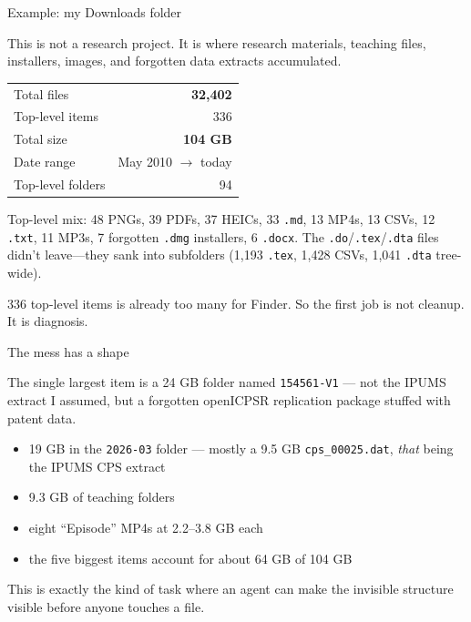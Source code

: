 \documentclass[aspectratio=169,11pt]{beamer}
\begin{document}
  \begin{frame}{Example: my Downloads folder}

  This is not a research project. It is where research materials, teaching files, installers, images, and forgotten data extracts accumulated.

  \vspace{0.18cm}

  \begin{center}
  \small
  \begin{tabular}{@{}lr@{}}
  \toprule
  Total files & \textbf{32,402} \\
  Top-level items & 336 \\
  Total size & \textbf{104 GB} \\
  Date range & May 2010 $\rightarrow$ today \\
  Top-level folders & 94 \\
  \bottomrule
  \end{tabular}
  \end{center}

  \vspace{0.1cm}

  {\small Top-level mix: 48 PNGs, 39 PDFs, 37 HEICs, 33 \texttt{.md}, 13 MP4s, 13 CSVs, 12 \texttt{.txt}, 11 MP3s, 7 forgotten \texttt{.dmg} installers, 6 \texttt{.docx}. The
  \texttt{.do}/\texttt{.tex}/\texttt{.dta} files didn't leave---they sank into subfolders (1{,}193 \texttt{.tex}, 1{,}428 CSVs, 1{,}041 \texttt{.dta} tree-wide).}

  \vspace{0.2cm}

  \alert{336 top-level items is already too many for Finder. So the first job is not cleanup. It is diagnosis.}

  \end{frame}

  \begin{frame}{The mess has a shape}

  The single largest item is a 24 GB folder named \texttt{154561-V1} --- not the IPUMS extract I assumed, but a forgotten openICPSR replication package stuffed with patent data.

  \vspace{0.3cm}

  \begin{itemize}\setlength\itemsep{0.3em}
      \item 19 GB in the \texttt{2026-03} folder --- mostly a 9.5 GB \texttt{cps\_00025.dat}, \emph{that} being the IPUMS CPS extract
      \item 9.3 GB of teaching folders
      \item eight ``Episode'' MP4s at 2.2--3.8 GB each
      \item the five biggest items account for about 64 GB of 104 GB
  \end{itemize}

  \vspace{0.35cm}

  \alert{This is exactly the kind of task where an agent can make the invisible structure visible before anyone touches a file.}

  \end{frame}
\end{document}
